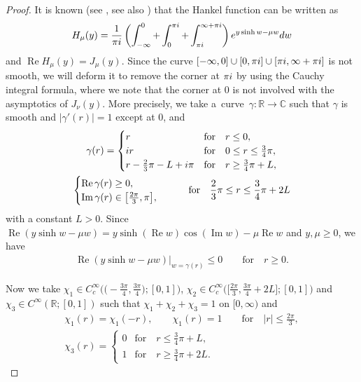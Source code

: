 \documentclass[10pt,a4paper]{article}
\numberwithin{equation}{section}
\def\R{\mathbb{R}}%
\DeclareMathOperator{\re}{Re}%
\DeclareMathOperator{\im}{Im}%
\def\c{\gamma}
\def\m{\mu}
\def\n{\nu}
\begin{document}
\begin{proof}
It is known (see \cite[Section~6.21\,(3)]{W}, see also \cite[equation~(9.7)]{IJ}) that the Hankel function can be written as
\begin{align}\label{Hankelint}
H_{\m}(y)=\frac{1}{\pi {\rm i}}\left(\int_{-\infty}^0+\int_0^{\pi {\rm i}}+\int_{\pi {\rm i}}^{\infty+\pi {\rm i}}\right){\rm e}^{y\sinh w-\m w}{\rm d}w
\end{align}
and $\re H_{\m}(y)=J_{\m}(y)$. Since the curve $[-\infty,0]\cup [0,\pi {\rm i}]\cup [\pi {\rm i},\infty+\pi {\rm i}]$ is not smooth, we will deform it to remove the corner at $\pi {\rm i}$ by using the Cauchy integral formula, where we note that the corner at $0$ is not involved with the asymptotics of $J_{\n}(y)$.
More precisely, we take a~curve~${\c\colon\R\to \mathbb{C}}$ such that $\c$ is smooth and $|\c'(r)|=1$ except at $0$, and
\begin{gather*}
\c(r)=\begin{cases}
r& \text{for}\quad r\leq 0,\\
 {\rm i}r& \text{for}\quad 0\leq r\leq \frac{3}{4}\pi,\\
r-\frac{2}{3}\pi-L+ {\rm i}\pi& \text{for}\quad r\geq \frac{3}{4}\pi+L,
\end{cases} \\
\begin{cases}\re \c(r)\geq 0,\\ \im \c(r)\in \bigl[\frac{2\pi}{3},\pi\bigr], \end{cases}\qquad \text{for}\quad \frac{2}{3}\pi\leq r\leq \frac{3}{4}\pi+2L
\end{gather*}
with a constant $L>0$. Since $\re (y\sinh w-\m w)=y\sinh(\re w)\cos(\im w)-\m \re w$ and $y,\m\geq 0$, we have
\begin{align}\label{Besphaseleq0}
\re (y\sinh w-\m w)|_{w=\c(r)}\leq 0\qquad \text{for}\quad r\geq 0.
\end{align}

Now we take $\chi_1\in C_c^{\infty}\bigl(\bigl(-\frac{3\pi}{4},\frac{3\pi}{4}\bigr);[0,1]\bigr)$, $\chi_2\in C_c^{\infty}\bigl(\bigl[\frac{2\pi}{3},\frac{3\pi}{4}+2L\bigr];[0,1]\bigr)$ and $\chi_3\in C^{\infty}(\R;[0,1])$ such that $\chi_1+\chi_2+\chi_3=1$ on $[0,\infty)$ and
\begin{gather*}
\chi_1(r)=\chi_1(-r),\qquad \chi_1(r)=1\qquad \text{for}\quad |r|\leq \frac{2\pi}{3},\\
 \chi_3(r)=\begin{cases}0& \text{for}\quad r\leq \frac{3}{4}\pi+L,\\ 1& \text{for}\quad r\geq \frac{3}{4}\pi+2L. \end{cases}
\end{gather*}


\end{proof}
\end{document}
